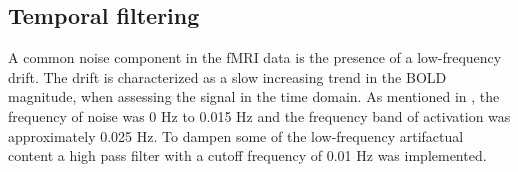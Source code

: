 \subsection{Temporal filtering}

A common noise component in the fMRI data is the presence of a low-frequency drift. The drift is characterized as a slow increasing trend in the BOLD magnitude, when assessing the signal in the time domain. As mentioned in , the frequency of noise was 0 Hz to 0.015 Hz and the frequency band of activation was approximately 0.025 Hz. To dampen some of the low-frequency artifactual content a high pass filter with a cutoff frequency of 0.01 Hz was implemented. \cite{FMRIB2018} \\


 
 
 
 
 
